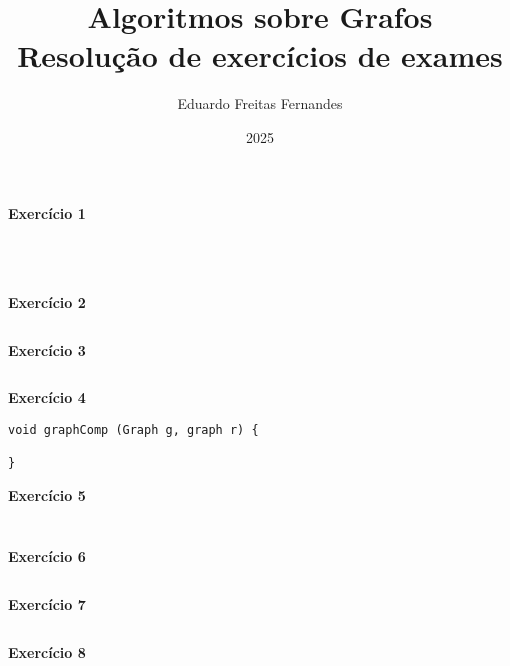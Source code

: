 \documentclass[12pt,a4paper]{article}
\title{Algoritmos sobre Grafos\\ Resolução de exercícios de exames}
\author{Eduardo Freitas Fernandes}
\date{2025}
\begin{document}
	
\maketitle
	
\noindent \textbf{Exercício 1}

\begin{verbatim}
\end{verbatim}

\begin{verbatim}
\end{verbatim}

\begin{verbatim}
\end{verbatim}

\begin{verbatim}
\end{verbatim}

\noindent \textbf{Exercício 2}

\begin{verbatim}
\end{verbatim}

\noindent \textbf{Exercício 3}

\begin{verbatim}
\end{verbatim}

\noindent \textbf{Exercício 4}

\begin{verbatim}
void graphComp (Graph g, graph r) {

}
\end{verbatim}

\noindent \textbf{Exercício 5}

\begin{verbatim}
\end{verbatim}

\begin{verbatim}
\end{verbatim}

\noindent \textbf{Exercício 6}

\begin{verbatim}
\end{verbatim}

\noindent \textbf{Exercício 7}

\begin{verbatim}
\end{verbatim}

\noindent \textbf{Exercício 8}

\begin{verbatim}
\end{verbatim}
\end{document}
